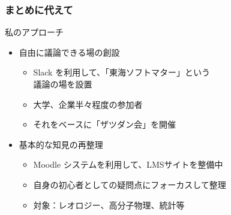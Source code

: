 \documentclass[12pt, dvipdfmx]{beamer}
\begin{document}
\begin{frame}
    \frametitle{まとめに代えて}
        \begin{exampleblock}{私のアプローチ}
            \begin{itemize}
                \item 自由に議論できる場の創設
                \begin{itemize}
                    \item Slack を利用して、「東海ソフトマター」という\\議論の場を設置
                    \item 大学、企業半々程度の参加者
                    \item それをベースに「ザツダン会」を開催
                \end{itemize}
                \item 基本的な知見の再整理
                \begin{itemize}
                    \item Moodle システムを利用して、LMSサイトを整備中
                    \item 自身の初心者としての疑問点にフォーカスして整理
                    \item 対象：レオロジー、高分子物理、統計等
                \end{itemize}
            \end{itemize}
        \end{exampleblock}
\end{frame}
\end{document}
